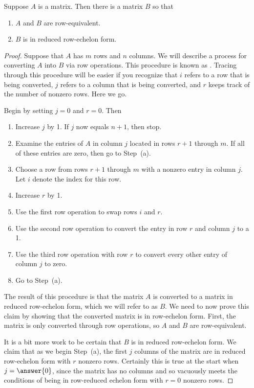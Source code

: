 \documentclass{ximera}
\begin{document}
\begin{theorem}
  Suppose $A$ is a matrix.  Then there is a matrix $B$ so that
  \begin{enumerate}
  \item $A$ and $B$ are row-equivalent.
  \item $B$ is in reduced row-echelon form.
  \end{enumerate}

\begin{proof}
Suppose that $A$ has $m$ rows and $n$ columns.  We will describe a process for converting $A$ into $B$ via row operations.  This procedure is known as .  Tracing through this procedure will be easier if you recognize that $i$ refers to a row that is being converted, $j$ refers to a column that is being converted, and $r$ keeps track of the number of nonzero rows.  Here we go.

Begin by setting $j=0$ and $r=0$.  Then
\begin{enumerate}
\item Increase $j$ by 1.  If $j$ now equals $n+1$, then stop.
\item Examine the entries of $A$ in column $j$ located in rows $r+1$ through $m$.  If all of these entries are zero, then go to Step~(a).
\item Choose a row from rows $r+1$ through $m$ with a nonzero entry in column $j$.  Let $i$ denote the index for this row.
\item Increase $r$ by 1.
\item Use the first row operation to swap rows $i$ and $r$.
\item Use the second row operation to convert the entry in row $r$ and column $j$ to a 1.
\item Use the third row operation with row $r$ to convert every other entry of column $j$ to zero.
\item Go to Step~(a).
\end{enumerate}

The result of this procedure is that the matrix $A$ is converted to a
matrix in reduced row-echelon form, which we will refer to as $B$.  We
need to now prove this claim by showing that the converted matrix is
in row-echelon form.  First, the matrix is only converted through row
operations, so $A$ and $B$ are row-equivalent.

It is a bit more work to be certain that $B$ is in reduced row-echelon
form.  We claim that as we begin Step~(a), the first $j$ columns of the
matrix are in reduced row-echelon form with $r$ nonzero rows.
Certainly this is true at the start when $j=\answer{0}$, since the
matrix has no columns and so vacuously meets the conditions of being
in row-reduced echelon form with $r=0$ nonzero rows.


\end{proof}
\end{theorem}
\end{document}
